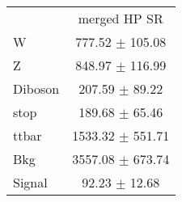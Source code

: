 \begin{tabular}{l|c|}
\cline{2-2}
 & \multicolumn{1}{c|}{merged HP SR}\\
W & 777.52 $\pm$ 105.08\\
Z & 848.97 $\pm$ 116.99\\
Diboson & 207.59 $\pm$ 89.22\\
stop & 189.68 $\pm$ 65.46\\
ttbar & 1533.32 $\pm$ 551.71\\
\hline
Bkg & 3557.08 $\pm$ 673.74\\
\hline
Signal & 92.23 $\pm$ 12.68\\
\end{tabular}
